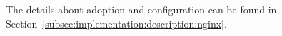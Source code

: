 The details about  adoption and configuration can be found in Section~\ref{subsec:implementation:description:nginx}.









